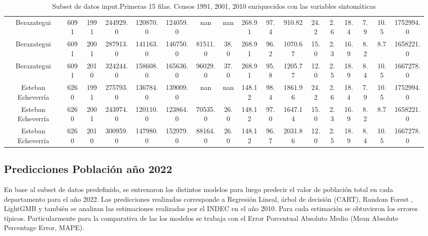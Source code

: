 \documentclass{article}
\theoremstyle{mytheoremstyle}
\theoremstyle{mytheoremstyle}
\theoremstyle{myproblemstyle}
\begin{document}
{\begin{landscape}
\begin{table}[htb]
\begin{tabular}{|c|c|c|c|c|c|c|c|c|c|c|c|c|c|c|c|c|}
        Berazategui & 6091 & 1991 & 244929.0 & 120870.0 & 124059.0 & nan & nan & 268.91 & 97.4 & 910.82 & 24.2 & 2.6 & 18.4 & 7.9 & 10.5 & 1752994.0 \\
        Berazategui & 6091 & 2001 & 287913.0 & 141163.0 & 146750.0 & 81511.0 & 38.0 & 268.91 & 96.2 & 1070.67 & 15.0 & 2.3 & 16.9 & 8.2 & 8.7 & 1658221.0 \\
        Berazategui & 6091 & 2010 & 324244.0 & 158608.0 & 165636.0 & 96029.0 & 37.0 & 268.91 & 95.8 & 1205.77 & 12.0 & 2.5 & 18.9 & 8.4 & 10.5 & 1667278.0 \\
        Esteban Echeverría & 6260 & 1991 & 275793.0 & 136784.0 & 139009.0 & nan & nan & 148.12 & 98.4 & 1861.96 & 24.2 & 2.6 & 18.4 & 7.9 & 10.5 & 1752994.0 \\
        Esteban Echeverría & 6260 & 2001 & 243974.0 & 120110.0 & 123864.0 & 70535.0 & 26.0 & 148.12 & 97.0 & 1647.14 & 15.0 & 2.3 & 16.9 & 8.2 & 8.7 & 1658221.0 \\
        Esteban Echeverría & 6260 & 2010 & 300959.0 & 147980.0 & 152979.0 & 88164.0 & 26.0 & 148.12 & 96.7 & 2031.86 & 12.0 & 2.5 & 18.9 & 8.4 & 10.5 & 1667278.0 \\
        \hline
      \end{tabular}
      \caption{Subset de datos input.Primeras 15 filas. Censos 1991, 2001, 2010 enriquecidos con las variables sintomáticas}
    \label{tab:baseModelos}
    \end{table}
    \end{landscape}
    
 }

 \subsection{Predicciones Población año 2022}

 En base al subset de datos predefinido, se entrenaron los distintos modelos para luego predecir el valor de población total en cada
 departamento para el año 2022. Las predicciones realizadas corresponde a  Regresión Lineal, árbol de decisión (CART), Random Forest , LightGMB
 y también se analizan las estimaciones realizadas por el INDEC en el año 2010. Para cada estimación se obtuvieron los errores 
 típicos. Particularmente para la comparativa de las los modelos se trabaja con el 
 Error Porcentual Absoluto Medio (Mean Absolute Percentage Error, MAPE).\newline
\end{document}
